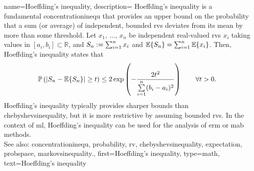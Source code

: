 {name={Hoeffding's inequality},
	description={ Hoeffding's inequality \cite{Hoeffding1963} is a fundamental \gls{concentrationinequ} 
		that provides an upper bound on the \gls{probability} that a sum (or average) of independent, bounded \glspl{rv} 
		deviates from its \gls{mean} by more than some threshold. 
		Let $x_1,\,\dots,\,x_n$ be independent real-valued \glspl{rv} $x_i$ taking values in $[a_i,b_i] \subset \mathbb{R}$, 
		and $S_n := \sum_{i=1}^n x_i$ and $\mathbb{E}\{S_n\} = \sum_{i=1}^n \mathbb{E}\{x_i\}$. 
		Then, Hoeffding's inequality \cite[Th. 2.2.6]{vershynin2018high} states that
        		\begin{equation}
                		\nonumber
			\mathbb{P}\left( |S_n - \mathbb{E}\{S_n\}| \geq t \right) 
            		\leq 2 \exp \left( -\frac{2 t^2}{\sum\limits_{i=1}^n (b_i - a_i)^2} \right) \qquad \forall t > 0.
        		\end{equation}
    		Hoeffding's inequality typically provides sharper bounds than \gls{chebyshevsinequality}, 
		but it is more restrictive by assuming bounded \glspl{rv}.
    		In the context of \gls{ml}, Hoeffding's inequality can be used for the analysis of \gls{erm} or \gls{mab} methods.
		 \\
    		See also: \gls{concentrationinequ}, \gls{probability}, \gls{rv}, \gls{chebyshevsinequality}, \gls{expectation}, \gls{probspace}, 
		\gls{markovsinequality}.},
    	first={Hoeffding's inequality},
	type=math, 
    	text={Hoeffding's inequality}  
}

